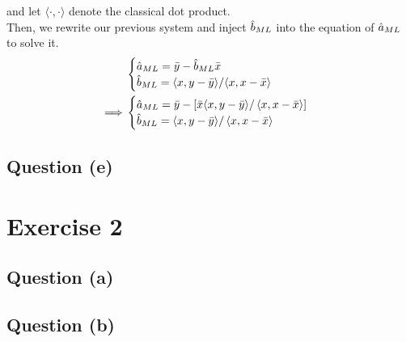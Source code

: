 \documentclass[12pt]{article}
\begin{document}
and let \(\langle \cdot, \cdot \rangle\) denote the classical dot product. \\
Then, we rewrite our previous system and inject \(\hat b_{ML}\) into the equation of \(\hat a_{ML}\) to solve it.
\begin{align*}
             &
    \begin{cases}
        \hat a_{ML} = \bar{y} - \hat b_{ML} \bar{x}                                                 \\
        \hat b_{ML} = \langle x, y-\bar{y}\rangle / {\left\langle x, x-\bar{x}\right\rangle} \\
    \end{cases} \\
    \implies &
    \begin{cases}
        \hat a_{ML} = \bar{y} - \left[\bar{x} \langle x, y-\bar{y}\rangle / \left\langle x, x-\bar{x}\right\rangle\right] \\
        \hat b_{ML} = \langle x, y-\bar{y}\rangle / \left\langle x, x-\bar{x}\right\rangle                   \\
    \end{cases} \\
\end{align*}

\subsection{Question (e)}
\section{Exercise 2} %
\subsection{Question (a)}
\subsection{Question (b)}

\clearpage

\end{document}
